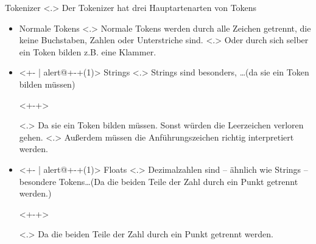   \begin{frame}{Tokenizer}
    \vspace*{1em}%
    \pause
        \note[item]<.>{
          Der Tokenizer hat drei Hauptartenarten von Tokens
        }
    \begin{itemize}[<+- | alert@+>]
      \item
        Normale Tokens
            \note[item]<.>{
              Normale Tokens werden durch alle Zeichen getrennt, die keine Buchstaben, Zahlen oder Unterstriche sind.
            }
            \note[item]<.>{
               Oder durch sich selber ein Token bilden  z.B. eine Klammer.
            }
      \item<+- | alert@+-+(1)>
        Strings
            \note[item]<.>{
              Strings sind besonders, \ldots (da sie ein Token bilden müssen)
            }
        \begin{uncoverenv}<+-+>%
        \end{uncoverenv}
            \note[item]<.>{
              Da sie ein Token bilden müssen. Sonst würden die Leerzeichen verloren gehen.
            }
            \note[item]<.>{
              Außerdem müssen die Anführungszeichen richtig interpretiert werden.
            }
      \item<+- | alert@+-+(1)>
        Floats
            \note[item]<.>{
              Dezimalzahlen sind -- ähnlich wie Strings -- besondere Tokens\ldots (Da die beiden Teile der Zahl durch ein Punkt getrennt werden.)
            }
        \begin{uncoverenv}<+-+>%
        \end{uncoverenv}
            \note[item]<.>{
              Da die beiden Teile der Zahl durch ein Punkt getrennt werden.
            }
    \end{itemize}
  \end{frame}


